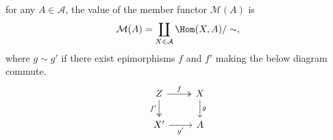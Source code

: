 \documentclass[main.tex]{subfiles}
\begin{document}
\begin{proposition}
  \label{prop:formula_for_member_functor}
  for any $A \in \mathcal{A}$, the value of the member functor $\mathcal{M}(A)$ is
  \begin{equation*}
    \mathcal{M}(A) = \coprod_{X \in \mathcal{A}}\Hom(X, A) / \sim,
  \end{equation*}
  where $g \sim g'$ if there exist epimorphisms $f$ and $f'$ making the below diagram commute.
  \begin{equation*}
    \begin{tikzcd}
      Z
      \arrow[r, twoheadrightarrow, "f"]
      \arrow[d, twoheadrightarrow, swap, "f'"]
      & X
      \arrow[d, "g"]
      \\
      X'
      \arrow[r, swap, "g'"]
      & A
    \end{tikzcd}
  \end{equation*}
\end{proposition}
\end{document}
